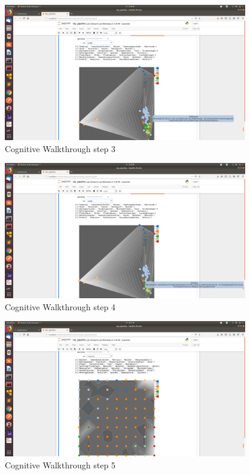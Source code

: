 \begin{figure}[t]
	\centering
	\includegraphics[width=400px]{../chapters/validation/pics/3}
	\caption{\label{pic:step3} Cognitive Walkthrough step 3}
\end{figure}

\begin{figure}[t]
	\centering
	\includegraphics[width=400px]{../chapters/validation/pics/4}
	\caption{\label{pic:step4} Cognitive Walkthrough step 4}
\end{figure}

\begin{figure}[t]
	\centering
	\includegraphics[width=400px]{../chapters/validation/pics/5}
	\caption{\label{pic:step5} Cognitive Walkthrough step 5}
\end{figure}

